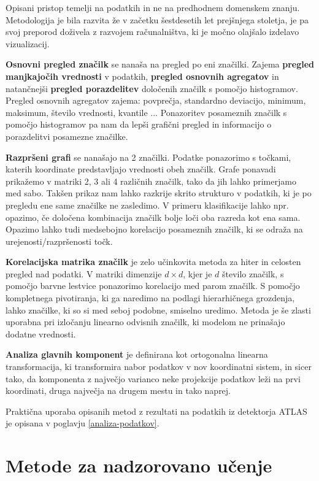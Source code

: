 \documentclass[11pt,a4paper,openany]{book}
\begin{document}
Opisani pristop temelji na podatkih in ne na predhodnem domenskem znanju. Metodologija je bila razvita že v začetku šestdesetih let prejšnjega stoletja, je pa svoj preporod doživela z razvojem računalništva, ki je močno olajšalo izdelavo vizualizacij. 

\textbf{Osnovni pregled značilk} se nanaša na pregled po eni značilki. Zajema \textbf{pregled manjkajočih vrednosti} v podatkih, \textbf{pregled osnovnih agregatov} in natančnejši \textbf{pregled porazdelitev} določenih značilk s pomočjo histogramov. Pregled osnovnih agregatov zajema: povprečja, standardno deviacijo, minimum, maksimum, število vrednosti, kvantile ... Ponazoritev posameznih značilk s pomočjo histogramov pa nam da lepši grafični pregled in informacijo o porazdelitvi posamezne značilke.

\textbf{Razpršeni grafi} se nanašajo na 2 značilki. Podatke ponazorimo s točkami, katerih koordinate predstavljajo vrednosti obeh značilk. Grafe ponavadi prikažemo v matriki 2, 3 ali 4 različnih značilk, tako da jih lahko primerjamo med sabo. Takšen prikaz nam lahko razkrije skrito strukturo v podatkih, ki je po pregledu ene same značilke ne zasledimo. V primeru klasifikacije lahko npr. opazimo, če določena kombinacija značilk bolje loči oba razreda kot ena sama. Opazimo lahko tudi medsebojno korelacijo posameznih značilk, ki se odraža na urejenosti/razpršenosti točk.

\textbf{Korelacijska matrika značilk} je zelo učinkovita metoda za hiter in celosten pregled nad podatki. V matriki dimenzije $d \times d$, kjer je $d$ število značilk, s pomočjo barvne lestvice ponazorimo korelacijo med parom značilk. S pomočjo kompletnega pivotiranja, ki ga naredimo na podlagi hierarhičnega grozdenja, lahko značilke, ki so si med seboj podobne, smiselno uredimo. Metoda je še zlasti uporabna pri izločanju linearno odvisnih značilk, ki modelom ne prinašajo dodatne vrednosti. 

\textbf{Analiza glavnih komponent} je definirana kot ortogonalna linearna transformacija, ki transformira nabor podatkov v nov koordinatni sistem, in sicer tako, da komponenta z največjo varianco neke projekcije podatkov leži na prvi koordinati, druga največja na drugem mestu in tako naprej.

Praktična uporaba opisanih metod z rezultati na podatkih iz detektorja ATLAS je opisana v poglavju \ref{analiza-podatkov}.

\section{Metode za nadzorovano učenje}
\end{document}
